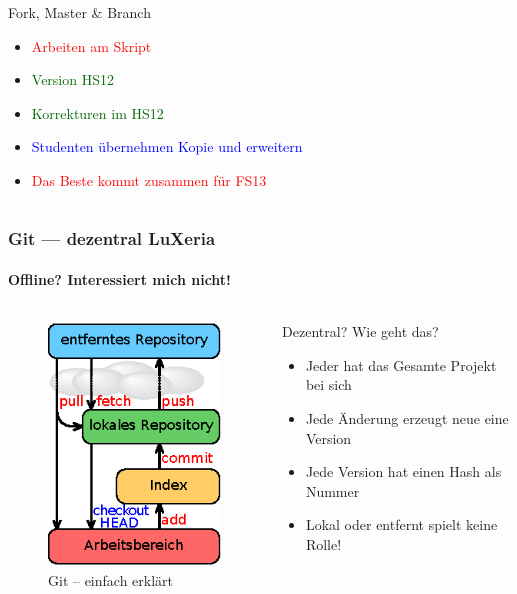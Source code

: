 \begin{frame}
\begin{columns}
\begin{column}{5cm}
\begin{block}{Fork, Master \& Branch}
\begin{itemize}
					\item \textcolor{red}{Arbeiten am Skript}
					\item \textcolor{darkgreen}{Version HS12}
					\item \textcolor{darkgreen}{Korrekturen im HS12}
					\item \textcolor{blue}{Studenten übernehmen Kopie und erweitern}
					\item \textcolor{red}{Das Beste kommt zusammen für FS13}
				\end{itemize}
			\end{block}
		\end{column}
	\end{columns}
\end{frame}

\begin{frame}
	\frametitle{Git --- dezentral \hfill{} LuXeria}
	\framesubtitle{Offline? Interessiert mich nicht!}
	\begin{columns}
		\begin{column}{5cm}
			\begin{figure}
				\includegraphics[scale=1.2]{git_local.eps}
				\caption{Git -- einfach erklärt}
			\end{figure}
		\end{column}
		\begin{column}{5cm}
			\begin{block}{Dezentral? Wie geht das?}
				\begin{itemize}
					\item Jeder hat das Gesamte Projekt bei sich
					\item Jede Änderung erzeugt neue eine Version
					\item Jede Version hat einen Hash als Nummer
					\item Lokal oder entfernt spielt keine Rolle!
				\end{itemize}
			\end{block}
		\end{column}
	\end{columns}
\end{frame}

